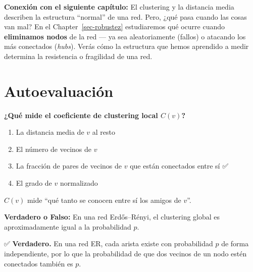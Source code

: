 \documentclass[
  letterpaper,
  DIV=11,
  numbers=noendperiod]{scrreprt}
\providecommand{\tightlist}{%
  \setlength{\itemsep}{0pt}\setlength{\parskip}{0pt}}
\begin{document}
\textbf{Conexión con el siguiente capítulo:} El clustering y la
distancia media describen la estructura ``normal'' de una red. Pero,
¿qué pasa cuando las cosas van mal? En el Chapter~\ref{sec-robustez}
estudiaremos qué ocurre cuando \textbf{eliminamos nodos} de la red ---
ya sea aleatoriamente (fallos) o atacando los más conectados
(\emph{hubs}). Verás cómo la estructura que hemos aprendido a medir
determina la resistencia o fragilidad de una red.

\section*{Autoevaluación}\label{autoevaluaciuxf3n-3}


\begin{tcolorbox}[enhanced jigsaw, toprule=.15mm, colframe=quarto-callout-caution-color-frame, coltitle=black, titlerule=0mm, colback=white, breakable, leftrule=.75mm, arc=.35mm, bottomtitle=1mm, toptitle=1mm, rightrule=.15mm, bottomrule=.15mm, left=2mm, title=\textcolor{quarto-callout-caution-color}{\faFire}\hspace{0.5em}{Pregunta 1}, colbacktitle=quarto-callout-caution-color!10!white, opacityback=0, opacitybacktitle=0.6]

\textbf{¿Qué mide el coeficiente de clustering local \(C(v)\)?}

\begin{enumerate}
\def\labelenumi{\alph{enumi})}
\tightlist
\item
  La distancia media de \(v\) al resto
\item
  El número de vecinos de \(v\)
\item
  La fracción de pares de vecinos de \(v\) que están conectados entre sí
  ✅
\item
  El grado de \(v\) normalizado
\end{enumerate}

\(C(v)\) mide ``qué tanto se conocen entre sí los amigos de \(v\)''.

\end{tcolorbox}

\begin{tcolorbox}[enhanced jigsaw, toprule=.15mm, colframe=quarto-callout-caution-color-frame, coltitle=black, titlerule=0mm, colback=white, breakable, leftrule=.75mm, arc=.35mm, bottomtitle=1mm, toptitle=1mm, rightrule=.15mm, bottomrule=.15mm, left=2mm, title=\textcolor{quarto-callout-caution-color}{\faFire}\hspace{0.5em}{Pregunta 2}, colbacktitle=quarto-callout-caution-color!10!white, opacityback=0, opacitybacktitle=0.6]

\textbf{Verdadero o Falso:} En una red Erdős--Rényi, el clustering
global es aproximadamente igual a la probabilidad \(p\).

✅ \textbf{Verdadero.} En una red ER, cada arista existe con
probabilidad \(p\) de forma independiente, por lo que la probabilidad de
que dos vecinos de un nodo estén conectados también es \(p\).

\end{tcolorbox}
\end{document}
